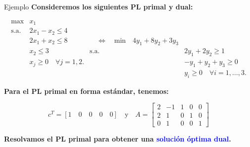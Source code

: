 \documentclass{beamer}
\begin{document}
\begin{frame}{Ejemplo}
    \textbf{Consideremos los siguientes PL primal y dual:}

    \[
    \begin{array}{lll}
    \text{max} & x_1 & \\
    \text{s.a.} & 2x_1 - x_2 \leq 4 & \\
    & 2x_1 + x_2 \leq 8 & \quad \Leftrightarrow \quad \text{min} \quad 4y_1 + 8y_2 + 3y_3 \\
    & x_2 \leq 3 & \text{s.a.} & 2y_1 + 2y_2 \geq 1 \\
    & x_j \geq 0 \quad \forall j = 1, 2. & & -y_1 + y_2 + y_3 \geq 0 \\
    & & & y_i \geq 0 \quad \forall i = 1, \ldots, 3.
    \end{array}
    \]

    \vspace{0.3cm}
    \textbf{Para el PL primal en \textbf{forma estándar}, tenemos:}

    \[
    c^T = \left[ 1 \quad 0 \quad 0 \quad 0 \quad 0 \right] \quad \text{y} \quad A = \left[ \begin{array}{ccccc}
    2 & -1 & 1 & 0 & 0 \\
    2 & 1 & 0 & 1 & 0 \\
    0 & 1 & 0 & 0 & 1
    \end{array} \right]
    \]

    \vspace{0.5cm}
    \textbf{Resolvamos el PL primal para obtener una \textcolor{blue}{solución óptima dual}.}
\end{frame}
\end{document}
